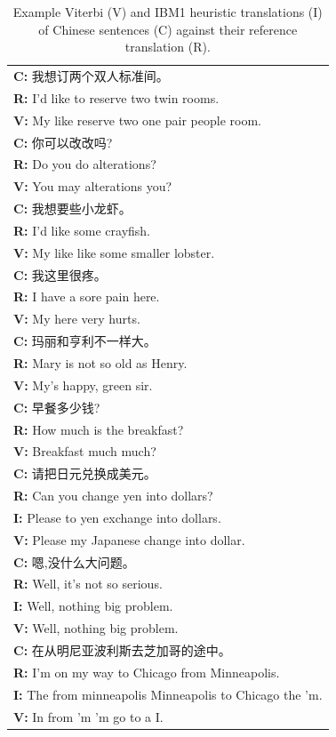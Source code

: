 \documentclass[11pt,a4paper]{article}
\begin{document}
\begin{table}
\center
{\small
\begin{CJK}{UTF8}{gbsn}
\begin{tabular}{ |l| } 
\hline
\textbf{C:} 我想订两个双人标准间。\\
\textbf{R:} I'd like to reserve two twin rooms. \\
\textbf{V:} My like reserve two one pair people room. \\
\hline
\textbf{C:} 你可以改改吗? \\
\textbf{R:} Do you do alterations? \\
\textbf{V:} You may alterations you? \\
\hline
\textbf{C:} 我想要些小龙虾。 \\
\textbf{R:} I'd like some crayfish. \\
\textbf{V:} My like like some smaller lobster. \\
\hline
\textbf{C:} 我这里很疼。 \\
\textbf{R:} I have a sore pain here. \\
\textbf{V:} My here very hurts. \\
\hline
\textbf{C:} 玛丽和亨利不一样大。 \\
\textbf{R:} Mary is not so old as Henry.\\
\textbf{V:} My's happy, green sir. \\
\hline
\textbf{C:} 早餐多少钱? \\
\textbf{R:} How much is the breakfast? \\
\textbf{V:} Breakfast much much? \\
\hline
\textbf{C:} 请把日元兑换成美元。 \\
\textbf{R:} Can you change yen into dollars? \\
\textbf{I:} Please to yen exchange into dollars. \\
\textbf{V:} Please my Japanese change into dollar. \\
\hline
\textbf{C:} 嗯,没什么大问题。 \\
\textbf{R:} Well, it's not so serious. \\
\textbf{I:} Well, nothing big problem. \\
\textbf{V:} Well, nothing big problem. \\
\hline
\textbf{C:} 在从明尼亚波利斯去芝加哥的途中。 \\
\textbf{R:} I'm on my way to Chicago from Minneapolis. \\
\textbf{I:} The from minneapolis Minneapolis to Chicago the 'm. \\
\textbf{V:} In from 'm 'm go to a I. \\

\hline 
\end{tabular}
\end{CJK}
}
\caption{Example Viterbi (V) and IBM1 heuristic translations (I) of Chinese sentences (C) against their reference translation (R).}
\label{table:translations}
\end{table}
\end{document}

